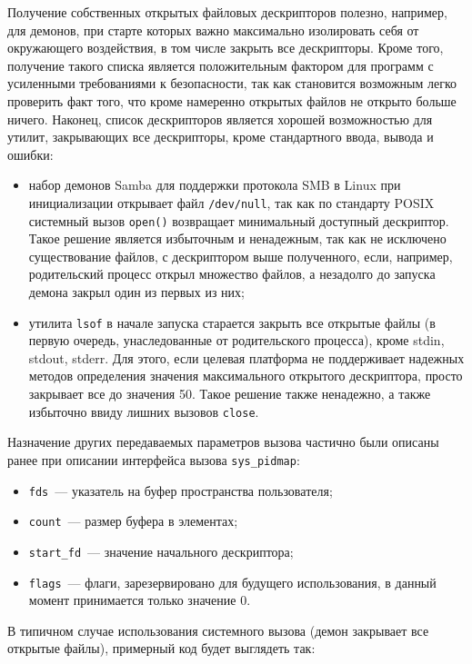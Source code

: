 Получение собственных открытых файловых дескрипторов полезно, например, для демонов,
при старте которых важно максимально изолировать себя от окружающего
воздействия, в том числе закрыть все дескрипторы. Кроме того, получение такого
списка является положительным фактором для программ с усиленными требованиями к
безопасности, так как становится возможным легко проверить факт того, что кроме
намеренно открытых файлов не открыто больше ничего. Наконец, список дескрипторов
является хорошей возможностью для утилит, закрывающих все дескрипторы, кроме
стандартного ввода, вывода и ошибки:
\begin{itemize}
\item набор демонов Samba для поддержки протокола SMB в Linux при инициализации
  открывает файл \texttt{/dev/null}, так как по стандарту POSIX системный вызов
  \texttt{open()} возвращает минимальный доступный дескриптор. Такое решение
  является избыточным и ненадежным, так как не исключено существование файлов, с
  дескриптором выше полученного, если, например, родительский процесс открыл
  множество файлов, а незадолго до запуска демона закрыл один из первых из них;
\item утилита \texttt{lsof} в начале запуска старается закрыть все открытые
  файлы (в первую очередь, унаследованные от родительского процесса), кроме
  stdin, stdout, stderr. Для этого, если целевая платформа не поддерживает
  надежных методов определения значения максимального открытого дескриптора,
  просто закрывает все до значения 50. Такое решение также ненадежно, а также
  избыточно ввиду лишних вызовов \texttt{close}.
\end{itemize}

Назначение других передаваемых параметров вызова частично были описаны ранее при
описании интерфейса вызова \texttt{sys\_pidmap}:
\begin{itemize}
\item \texttt{fds}~--- указатель на буфер пространства пользователя;
\item \texttt{count}~--- размер буфера в элементах;
\item \texttt{start\_fd}~--- значение начального дескриптора;
\item \texttt{flags}~--- флаги, зарезервировано для будущего использования,
  в данный момент принимается только значение 0.
\end{itemize}

В типичном случае использования системного вызова (демон закрывает все открытые
файлы), примерный код будет выглядеть так:

